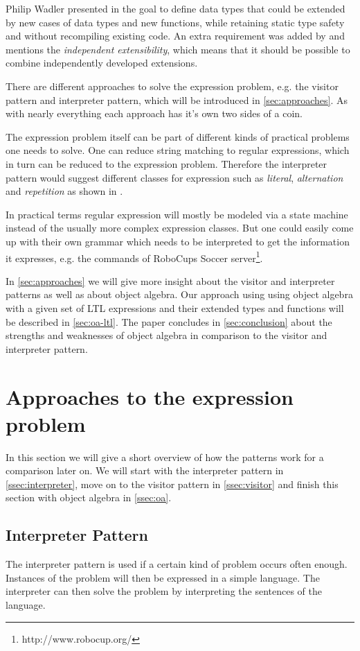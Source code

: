 \documentclass{llncs}
\begin{document}
Philip Wadler presented in \cite{wadler98} the goal to define data types that could be extended by new cases of data types and new functions, while retaining static type safety and without recompiling existing code. An extra requirement was added by \cite{Odersky05} and mentions the \emph{independent extensibility}, which means that it should be possible to combine independently developed extensions.

There are different approaches to solve the expression problem, e.g. the visitor pattern and interpreter pattern, which will be introduced in \autoref{sec:approaches}. As with nearly everything each approach has it's own two sides of a coin. 

The expression problem itself can be part of different kinds of practical problems one needs to solve. One can reduce string matching to regular expressions, which in turn can be reduced to the expression problem. Therefore the interpreter pattern would suggest different classes for expression such as \emph{literal}, \emph{alternation} and \emph{repetition} as shown in \cite{GHJV94}.

In practical terms regular expression will mostly be modeled via a state machine instead of the usually more complex expression classes. But one could easily come up with their own grammar which needs to be interpreted to get the information it expresses, e.g. the commands of RoboCups Soccer server\footnote{http://www.robocup.org/}.

In \autoref{sec:approaches} we will give more insight about the visitor and interpreter patterns as well as about object algebra. Our approach using using object algebra with a given set of LTL expressions and their extended types and functions will be described in \autoref{sec:oa-ltl}. The paper concludes in \autoref{sec:conclusion} about the strengths and weaknesses of object algebra in comparison to the visitor and interpreter pattern.

\section{Approaches to the expression problem} \label{sec:approaches}
In this section we will give a short overview of how the patterns work for a comparison later on. We will start with the interpreter pattern in \autoref{ssec:interpreter}, move on to the visitor pattern in \autoref{ssec:visitor} and finish this section with object algebra in \autoref{ssec:oa}.

\subsection{Interpreter Pattern} \label{ssec:interpreter}
The interpreter pattern is used if a certain kind of problem occurs often enough. Instances of the problem will then be expressed in a simple language. The interpreter can then solve the problem by interpreting the sentences of the language.
\end{document}
